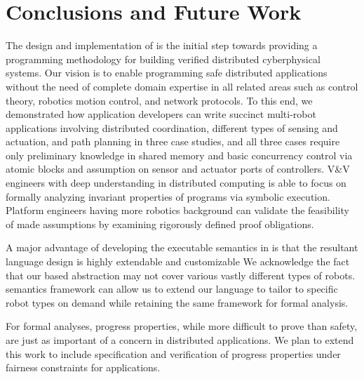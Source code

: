 \section{Conclusions and Future Work}

The design and implementation of \lgname is the initial step towards providing a programming methodology for building verified distributed cyberphysical systems.
Our vision is to enable programming safe distributed applications without the need of complete domain expertise in all related areas such as control theory, robotics motion control, and network protocols.
To this end, we demonstrated how \lgname application developers can write succinct multi-robot applications involving distributed coordination,
different types of sensing and actuation, and path planning in three case studies,
and all three cases require only preliminary knowledge
in shared memory and basic concurrency control via atomic blocks and assumption on sensor and actuator ports of controllers.
V\&V engineers with deep understanding in distributed computing is able to focus on formally analyzing invariant properties of \lgname programs via symbolic execution.
Platform engineers having more robotics background can validate the feasibility of made assumptions by examining rigorously defined proof obligations.

A major advantage of developing the executable semantics in \K is that the resultant language design is highly extendable and customizable
We acknowledge the fact that our \portasum based abstraction may not cover various vastly different types of robots.
\K semantics framework can allow us to extend our language to tailor to specific robot types on demand
while retaining the same framework for formal analysis.

For formal analyses,
progress properties, while more difficult to prove than safety, are just as important of a concern in distributed applications.
We plan to extend this work to include specification and verification of progress properties under fairness constraints for \lgname applications.
